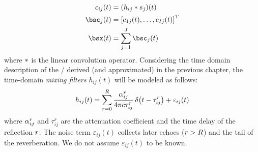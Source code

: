 \begin{align}
    \img_{\idxMic\idxSrc}(t) &=  \kparen{h_{\idxMic\idxSrc} \conv \src_\idxSrc} (t)     \label{eq:processing:mixing:img} \\
    \imgs_\idxSrc(t) &= \ktranspose{\klist{\img_{1\idxSrc}(t), \dots, \img_{\numMics\idxSrc}(t)}} \nonumber\\
    \mics(t)         &= \sum_{\idxSrc=1}^{\numSrcs} \imgs_\idxSrc(t)                    \label{eq:processing:mixing:mix}
\end{align}%
where $\ast$ is the linear convolution operator.
Considering the time domain description of the \RIR/ derived (and approximated) in the previous chapter,
the time-domain \emph{mixing filters} $h_{ij}( t)$ will be modeled as follows:
\begin{equation}\label{eq:processing:mixing_filter}
    h_{ij}( t) = \sum_{\idxEch=0}^{\numEchs} \frac{\absCoeff_{ij}^r}{4 \pi \speedOfSound \tau_{ij}^r}
                       \diracOf{t - \tau_{ij}^r} + \varepsilon_{ij}(t)
\end{equation}
where $\alpha_{ij}^r$ and $\tau_{ij}^r$ are the attenuation coefficient and the time delay of the reflection $r$.
The noise term $\varepsilon_{ij}( t)$ collects later echoes ($r > R$) and the tail of the reverberation.
We do not assume $\varepsilon_{ij}( t)$ to be known.

